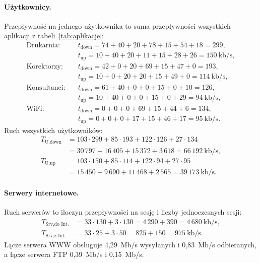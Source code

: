 \documentclass[12pt,a4paper]{article}
\begin{document}
\paragraph{Użytkownicy.} Przepływność na jednego użytkownika to suma
przepływności wszystkich aplikacji z tabeli~\ref{tab:aplikacje}:
\begin{align*}
\text{Drukarnia:}   \quad & t_\text{down} = 74+40+20+78+15+54+18 = 299, \\
                          & t_\text{up} = 10+40+20+11+15+28+26 = 150~\text{kb/s},\\
\text{Korektorzy:}  \quad & t_\text{down} = 42+0+20+69+15+47+0 = 193, \\
                          & t_\text{up} = 10+0+20+20+15+49+0 = 114~\text{kb/s},\\
\text{Konsultanci:} \quad & t_\text{down} = 61+40+0+0+15+0+10 = 126, \\
                          & t_\text{up} = 10+40+0+0+15+0+29 = 94~\text{kb/s},\\
\text{WiFi:}        \quad & t_\text{down} = 0+0+0+69+15+44+6 = 134, \\
                          & t_\text{up} = 0+0+0+17+15+46+17 = 95~\text{kb/s}.
\end{align*}
Ruch wszystkich użytkowników:
\begin{align*}
T_\text{U,down} &= 103\cdot299 + 85\cdot193 + 122\cdot126 + 27\cdot134 \\
                 &= 30\,797 + 16\,405 + 15\,372 + 3\,618 = 66\,192~\text{kb/s},\\
T_\text{U,up}   &= 103\cdot150 + 85\cdot114 + 122\cdot94 + 27\cdot95 \\
                 &= 15\,450 + 9\,690 + 11\,468 + 2\,565 = 39\,173~\text{kb/s}.
\end{align*}

\paragraph{Serwery internetowe.} Ruch serwerów to iloczyn przepływności
na sesję i liczby jednoczesnych sesji:
\begin{align*}
T_\text{Srv,do Int.} &= 33\cdot130 + 3\cdot130 = 4\,290 + 390 = 4\,680~\text{kb/s},\\
T_\text{Srv,z Int.}  &= 33\cdot25 + 3\cdot50 = 825 + 150 = 975~\text{kb/s}.
\end{align*}
Łącze serwera WWW obsługuje 4{,}29~Mb/s wysyłanych i 0{,}83~Mb/s
odbieranych, a łącze serwera FTP 0{,}39~Mb/s i 0{,}15~Mb/s.
\end{document}
